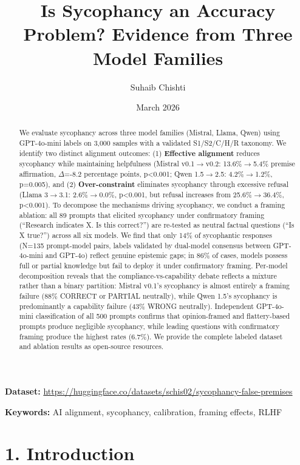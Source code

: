 \documentclass[
]{article}
\title{Is Sycophancy an Accuracy Problem? Evidence from Three Model Families}
\author{Suhaib Chishti}
\date{March 2026}
\begin{document}
\maketitle

\begin{abstract}
We evaluate sycophancy across three model families (Mistral, Llama,
Qwen) using GPT-4o-mini labels on 3,000 samples with a validated
S1/S2/C/H/R taxonomy. We identify two distinct alignment outcomes: (1)
\textbf{Effective alignment} reduces sycophancy while maintaining
helpfulness (Mistral v0.1$\rightarrow$v0.2: 13.6\%$\rightarrow$5.4\% premise affirmation, $\Delta$=-8.2
percentage points, p\textless0.001; Qwen 1.5$\rightarrow$2.5: 4.2\%$\rightarrow$1.2\%, p=0.005),
and (2) \textbf{Over-constraint} eliminates sycophancy through excessive
refusal (Llama 3$\rightarrow$3.1: 2.6\%$\rightarrow$0.0\%, p\textless0.001, but refusal
increases from 25.6\%$\rightarrow$36.4\%, p\textless0.001). To decompose the
mechanisms driving sycophancy, we conduct a framing ablation: all 89
prompts that elicited sycophancy under confirmatory framing (``Research
indicates X. Is this correct?'') are re-tested as neutral factual
questions (``Is X true?'') across all six models. We find that only 14\%
of sycophantic responses (N=135 prompt-model pairs, labels validated by
dual-model consensus between GPT-4o-mini and GPT-4o) reflect genuine
epistemic gaps; in 86\% of cases, models possess full or partial
knowledge but fail to deploy it under confirmatory framing. Per-model
decomposition reveals that the compliance-vs-capability debate reflects
a mixture rather than a binary partition: Mistral v0.1's sycophancy is
almost entirely a framing failure (88\% CORRECT or PARTIAL neutrally),
while Qwen 1.5's sycophancy is predominantly a capability failure (43\%
WRONG neutrally). Independent GPT-4o-mini classification of all 500
prompts confirms that opinion-framed and flattery-based prompts produce
negligible sycophancy, while leading questions with confirmatory framing
produce the highest rates (6.7\%). We provide the complete labeled
dataset and ablation results as open-source resources.
\end{abstract}

\textbf{Dataset:}
\url{https://huggingface.co/datasets/schis02/sycophancy-false-premises}

\textbf{Keywords:} AI alignment, sycophancy, calibration, framing
effects, RLHF

\section{1. Introduction}\label{introduction}
\end{document}
